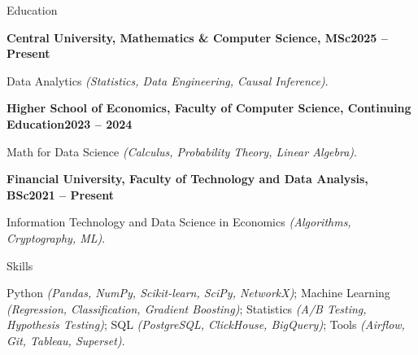 \documentclass[]{mcdowellcv}
\renewenvironment{cvsubsection}[2]{%
  \begin{adjustwidth}{\subsectionmargin}{\subsectionmargin}%
    {\bfseries #1}\hfill #2\par\vspace{1em}%
}{%
  \end{adjustwidth}%
  \vspace*{\aftersubsectionspace}%
}
\begin{document}
\begin{cvsection}{\Large Education}

    \begin{cvsubsection}{Central University, Mathematics \& Computer Science, MSc}{\textbf{2025 -- Present}}
        \vspace{-1.2em}
        \par\noindent\hspace{1em}%
        Data Analytics \textit{(Statistics, Data Engineering, Causal Inference)}.
    \end{cvsubsection}

    \begin{cvsubsection}{Higher School of Economics, Faculty of Computer Science, Continuing Education}{\textbf{2023 -- 2024}}
        \vspace{-1.2em}
        \par\noindent\hspace{1em}%
        Math for Data Science \textit{(Calculus, Probability Theory, Linear Algebra)}.
    \end{cvsubsection}

    \begin{cvsubsection}{Financial University, Faculty of Technology and Data Analysis, BSc}{\textbf{2021 -- Present}}
        \vspace{-1.2em}
        \par\noindent\hspace{1em}%
        Information Technology and Data Science in Economics \textit{(Algorithms, Cryptography, ML)}.
    \end{cvsubsection}

\end{cvsection}

	
\begin{cvsection}{\Large Skills}
    \vspace{-1.55em}
    \begin{cvsubsection}{}{}
        Python \textit{(Pandas, NumPy, Scikit-learn, SciPy, NetworkX)};
        Machine Learning \textit{(Regression, Classification, Gradient Boosting)};
        Statistics \textit{(A/B Testing, Hypothesis Testing)};
        SQL \textit{(PostgreSQL, ClickHouse, BigQuery)};
        Tools \textit{(Airflow, Git, Tableau, Superset)}.
    \end{cvsubsection}
\end{cvsection}
	
\end{document}
